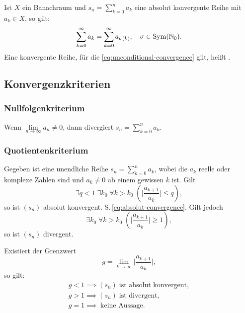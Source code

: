 Ist $X$ ein Banachraum und $s_n=\sum_{k=0}^n a_k$ eine
absolut konvergente Reihe mit $a_k\in X$, so gilt:
\begin{equation}\label{eq:unconditional-convergence}
\sum_{k=0}^\infty a_k = \sum_{k=0}^\infty a_{\sigma(k)},\quad
\sigma\in\operatorname{Sym}(\mathbb N_0).
\end{equation}
Eine konvergente Reihe, für die \eqref{eq:unconditional-convergence}
gilt, heißt .

\subsection{Konvergenzkriterien}
\subsubsection{Nullfolgenkriterium}
Wenn $\lim\limits_{n\to\infty}a_n\ne 0$, dann divergiert $s_n=\sum\limits_{k=0}^n a_k$.

\subsubsection{Quotientenkriterium}
Gegeben ist eine unendliche Reihe $s_n=\sum_{k=0}^n a_k$, wobei
die $a_k$ reelle oder komplexe Zahlen sind und $a_k\ne 0$ ab einem
gewissen $k$ ist. Gilt
\begin{equation}
\exists q{<}1\;\exists k_0\;\forall k{>}k_0\;(\Big|\frac{a_{k+1}}{a_k}\Big|\le q),
\end{equation}
so ist $(s_n)$ absolut konvergent. S.\,\eqref{eq:absolut-convergence}.
Gilt jedoch
\begin{equation}
\exists k_0\;\forall k{>}k_0\;(\Big|\frac{a_{k+1}}{a_k}\Big|\ge 1),
\end{equation}
so ist $(s_n)$ divergent.

Existiert der Grenzwert
\begin{equation}
g = \lim_{k\to\infty}\Big|\frac{a_{k+1}}{a_k}\Big|,
\end{equation}
so gilt:
\begin{gather}
g<1\implies(s_n)\;\text{ist absolut konvergent},\\
g>1\implies(s_n)\;\text{ist divergent},\\
g=1\implies\;\text{keine Aussage}.
\end{gather}

